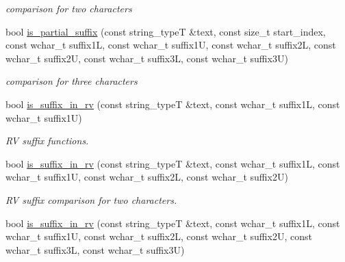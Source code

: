\begin{DoxyCompactItemize}
\begin{DoxyCompactList}\small\item\em comparison for two characters \end{DoxyCompactList}\item 
\hypertarget{group___stemming_ga728ea4e26737b04d04e02bea863f29e4}{bool \hyperlink{group___stemming_ga728ea4e26737b04d04e02bea863f29e4}{is\-\_\-partial\-\_\-suffix} (const string\-\_\-type\-T \&text, const size\-\_\-t start\-\_\-index, const wchar\-\_\-t suffix1\-L, const wchar\-\_\-t suffix1\-U, const wchar\-\_\-t suffix2\-L, const wchar\-\_\-t suffix2\-U, const wchar\-\_\-t suffix3\-L, const wchar\-\_\-t suffix3\-U)}\label{group___stemming_ga728ea4e26737b04d04e02bea863f29e4}

\begin{DoxyCompactList}\small\item\em comparison for three characters \end{DoxyCompactList}\item 
bool \hyperlink{group___stemming_ga2c92d7447b5cc97d0fca165d2b0e7d68}{is\-\_\-suffix\-\_\-in\-\_\-rv} (const string\-\_\-type\-T \&text, const wchar\-\_\-t suffix1\-L, const wchar\-\_\-t suffix1\-U)
\begin{DoxyCompactList}\small\item\em R\-V suffix functions. \end{DoxyCompactList}\item 
\hypertarget{group___stemming_ga359356fbaafc3c7154d94fda6916ffa0}{bool \hyperlink{group___stemming_ga359356fbaafc3c7154d94fda6916ffa0}{is\-\_\-suffix\-\_\-in\-\_\-rv} (const string\-\_\-type\-T \&text, const wchar\-\_\-t suffix1\-L, const wchar\-\_\-t suffix1\-U, const wchar\-\_\-t suffix2\-L, const wchar\-\_\-t suffix2\-U)}\label{group___stemming_ga359356fbaafc3c7154d94fda6916ffa0}

\begin{DoxyCompactList}\small\item\em R\-V suffix comparison for two characters. \end{DoxyCompactList}\item 
\hypertarget{group___stemming_ga00fa5d00ff53320a437fe96a5bfa8f44}{bool \hyperlink{group___stemming_ga00fa5d00ff53320a437fe96a5bfa8f44}{is\-\_\-suffix\-\_\-in\-\_\-rv} (const string\-\_\-type\-T \&text, const wchar\-\_\-t suffix1\-L, const wchar\-\_\-t suffix1\-U, const wchar\-\_\-t suffix2\-L, const wchar\-\_\-t suffix2\-U, const wchar\-\_\-t suffix3\-L, const wchar\-\_\-t suffix3\-U)}\label{group___stemming_ga00fa5d00ff53320a437fe96a5bfa8f44}


\end{DoxyCompactItemize}
